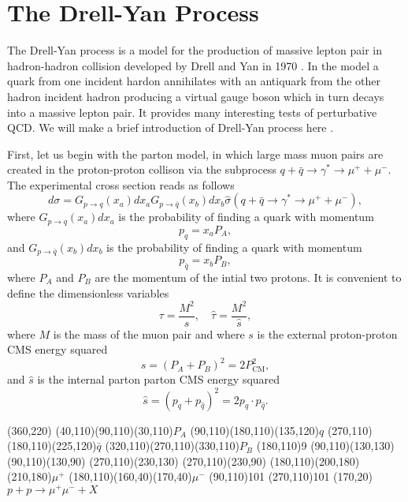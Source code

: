 \chapter{The Drell-Yan Process}
The Drell-Yan process is a model for the production of massive lepton pair in hadron-hadron collision developed by Drell and Yan in 1970 \cite{DY}. In the model a quark from one incident hardon annihilates with an antiquark from the other hadron incident hadron producing a virtual gauge boson which in turn decays into a massive lepton pair. It provides many interesting tests of perturbative QCD. We will make a brief introduction of Drell-Yan process here \cite{FieldQCD}.

First, let us begin with the parton model, in which large mass muon pairs are created in the proton-proton collison via the subprocess $q+\bar{q}\to\gamma^\ast\to\mu^++\mu^-$. The experimental cross section reads as follows
\begin{equation}
d\sigma=G_{p\to q}(x_a)dx_a G_{p\to \bar{q}}(x_b)dx_b\hat{\sigma}(q+\bar{q}\to\gamma^\ast\to\mu^++\mu^-),
\end{equation}
where $G_{p\to q}(x_a)dx_a$ is the probability of finding a quark with momentum
\begin{equation}
p_q=x_aP_A,
\end{equation}
and $G_{p\to \bar{q}}(x_b)dx_b$ is the probability of finding a quark with momentum
\begin{equation}
p_{\bar{q}} =x_bP_B,
\end{equation}
where $P_A$ and $P_B$ are the momentum of the intial two protons. It is convenient to define the dimensionless variables
\begin{equation}
\tau=\frac{M^2}{s}, \quad \hat{\tau}=\frac{M^2}{\hat{s}},
\end{equation}
where $M$ is the mass of the muon pair and where $s$ is the external proton-proton CMS energy squared
\begin{equation}
s=(P_A+P_B)^2=2P^2_\text{CM},
\end{equation}
and $\hat{s}$ is the internal parton parton CMS energy squared
\begin{equation}
\hat{s}=(p_q+p_{\hat{q}})^2=2p_q\cdot p_{\hat{q}}.
\end{equation}
\begin{axopicture}(360,220) 
	(40,110)(90,110)\Text(30,110){$P_A$}		
	\Line[arrow](90,110)(180,110)\Text(135,120){$q$}		
	\Line[arrow](270,110)(180,110)\Text(225,120){$\bar{q}$}
	(320,110)(270,110)\Text(330,110){$P_B$}	
	\Vertex(180,110){9}	
	\Line[arrow](90,110)(130,130)
	\Line[arrow](90,110)(130,90)
	\Line[arrow](270,110)(230,130)	
	\Line[arrow](270,110)(230,90)
	\Line[arrow](180,110)(200,180)\Text(210,180){$\mu^+$}	
	\Line[arrow](180,110)(160,40)\Text(170,40){$\mu^-$}
	\GCirc(90,110){10}{1}
	\GCirc(270,110){10}{1}
	\Text(170,20){$p+p\to\mu^+\mu^-+X$}
\end{axopicture}
